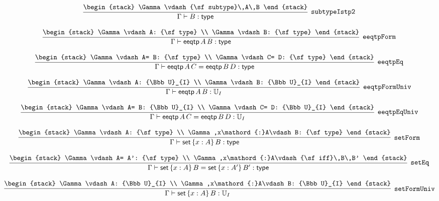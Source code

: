 \[
\infer[{\tt subtypeIstp2}]{\Gamma \vdash B: {\sf type}}{
\begin{stack}
\Gamma \vdash {\sf subtype}\,A\,B
\end{stack}}
\]

\[
\infer[{\tt eeqtpForm}]{\Gamma \vdash {\sf eeqtp}\,A\,B: {\sf type}}{
\begin{stack}
\Gamma \vdash A: {\sf type}
\\
\Gamma \vdash B: {\sf type}
\end{stack}}
\]

\[
\infer[{\tt eeqtpEq}]{\Gamma \vdash {\sf eeqtp}\,A\,C= {\sf eeqtp}\,B\,D: {\sf type}}{
\begin{stack}
\Gamma \vdash A= B: {\sf type}
\\
\Gamma \vdash C= D: {\sf type}
\end{stack}}
\]

\[
\infer[{\tt eeqtpFormUniv}]{\Gamma \vdash {\sf eeqtp}\,A\,B: {\Bbb U}_{I}}{
\begin{stack}
\Gamma \vdash A: {\Bbb U}_{I}
\\
\Gamma \vdash B: {\Bbb U}_{I}
\end{stack}}
\]

\[
\infer[{\tt eeqtpEqUniv}]{\Gamma \vdash {\sf eeqtp}\,A\,C= {\sf eeqtp}\,B\,D: {\Bbb U}_{I}}{
\begin{stack}
\Gamma \vdash A= B: {\Bbb U}_{I}
\\
\Gamma \vdash C= D: {\Bbb U}_{I}
\end{stack}}
\]

\[
\infer[{\tt setForm}]{\Gamma \vdash {\sf set}\,\{x : A\}\,B: {\sf type}}{
\begin{stack}
\Gamma \vdash A: {\sf type}
\\
\Gamma ,x\mathord{:}A\vdash B: {\sf type}
\end{stack}}
\]

\[
\infer[{\tt setEq}]{\Gamma \vdash {\sf set}\,\{x : A\}\,B= {\sf set}\,\{x : A'\}\,B': {\sf type}}{
\begin{stack}
\Gamma \vdash A= A': {\sf type}
\\
\Gamma ,x\mathord{:}A\vdash {\sf iff}\,B\,B'
\end{stack}}
\]

\[
\infer[{\tt setFormUniv}]{\Gamma \vdash {\sf set}\,\{x : A\}\,B: {\Bbb U}_{I}}{
\begin{stack}
\Gamma \vdash A: {\Bbb U}_{I}
\\
\Gamma ,x\mathord{:}A\vdash B: {\Bbb U}_{I}
\end{stack}}
\]

